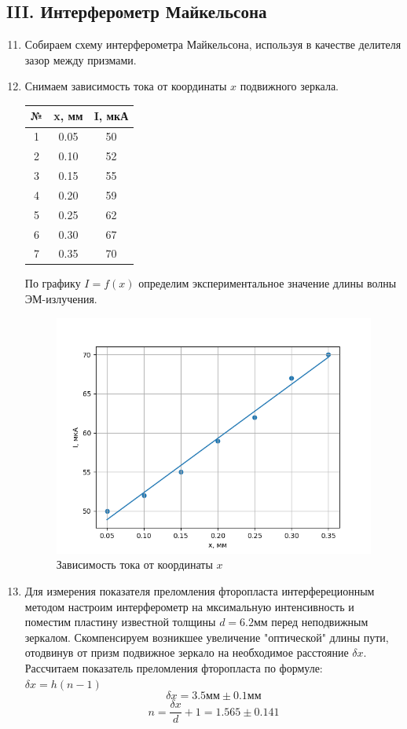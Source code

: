 \documentclass[a4paper,12pt]{article}
\begin{document}
\subsection{III. Интерферометр Майкельсона}
\begin{enumerate}
    \setcounter{enumi}{10}
    \item Собираем схему интерферометра Майкельсона, используя в качестве делителя зазор между призмами.
    \item Снимаем зависимость тока от координаты $x$ подвижного зеркала.
    
    \begin{table}[h!]
    \centering
        \begin{tabular}{||c|c|c||} 
        \hline
        № & x, мм & I, мкА \\ [0.5ex] 
        \hline\hline
        1 & 0.05 & 50 \\ 
        2 & 0.10 & 52 \\
        3 & 0.15 & 55 \\
        4 & 0.20 & 59 \\
        5 & 0.25 & 62 \\
        6 & 0.30 & 67 \\
        7 & 0.35 & 70 \\ [1ex] 
        \hline
        \end{tabular}
    \end{table}
    
    По графику $I = f (x)$ определим экспериментальное значение длины волны ЭМ-излучения.

    \begin{figure}[h]
    \centering
    \includegraphics[width=0.65\linewidth]{graph3.png}
    \caption{Зависимость тока от координаты $x$}
    \label{graph3}
    \end{figure}
    
    \item Для измерения показателя преломления фторопласта интерфереционным методом настроим интерферометр на мксимальную интенсивность и поместим пластину известной толщины $d = 6.2\text{мм}$ перед неподвижным зеркалом. Скомпенсируем возникшее увеличение "оптической" длины пути, отодвинув от призм подвижное зеркало на необходимое расстояние $\delta x$. Рассчитаем показатель преломления фторопласта по формуле: $\delta x = h(n-1)$
    $$
    \delta x = 3.5\text{мм} \pm 0.1\text{мм}
    $$
    $$
    n = \frac{\delta x}{d} + 1 = 1.565 \pm 0.141
    $$


\end{enumerate}
\end{document}
